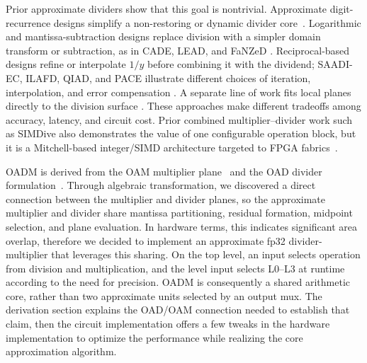 \documentclass[conference]{IEEEtran}
\begin{document}
Prior approximate dividers show that this goal is nontrivial. Approximate
digit-recurrence designs simplify a non-restoring or dynamic divider
core~\cite{chen2015nonrestoring,hashemi2016dynamic}. Logarithmic and
mantissa-subtraction designs replace division with a simpler domain transform
or subtraction, as in CADE, LEAD, and FaNZeD
\cite{imani2019cade,ratnaparkhi2022lead,saadat2019fanzed}. Reciprocal-based
designs refine or interpolate $1/y$ before combining it with the dividend;
SAADI-EC, ILAFD, QIAD, and PACE illustrate different choices of iteration,
interpolation, and error compensation
\cite{melchert2019saadi,oelund2023ilafd,liu2023qiad,wen2025pace}. A separate
line of work fits local planes directly to the division surface
\cite{wu2015curve,wu2024plsad}. These approaches make different tradeoffs
among accuracy, latency, and circuit cost. Prior combined multiplier--divider
work such as SIMDive also demonstrates the value of one configurable operation
block, but it is a Mitchell-based integer/SIMD architecture targeted to FPGA
fabrics~\cite{ebrahimi2020simdive}.

OADM is derived from the OAM multiplier plane~\cite{chen2020oam} and the OAD
divider formulation~\cite{oad2023}. Through algebraic transformation, we discovered a direct connection between the multiplier and divider planes, so the approximate multiplier and divider share mantissa partitioning, residual
formation, midpoint selection, and plane evaluation. In hardware terms, this indicates significant area overlap, therefore we decided to implement an approximate fp32 divider-multiplier that leverages this sharing.
On the top level, an input selects operation from division and multiplication, and the level input
selects L0--L3 at runtime according to the need for precision. OADM is consequently a shared arithmetic core, rather than two approximate
units selected by an output mux. The derivation section explains the OAD/OAM
connection needed to establish that claim, then  the circuit implementation offers a few tweaks in the hardware implementation to optimize the performance while realizing the core approximation algorithm.
\end{document}
